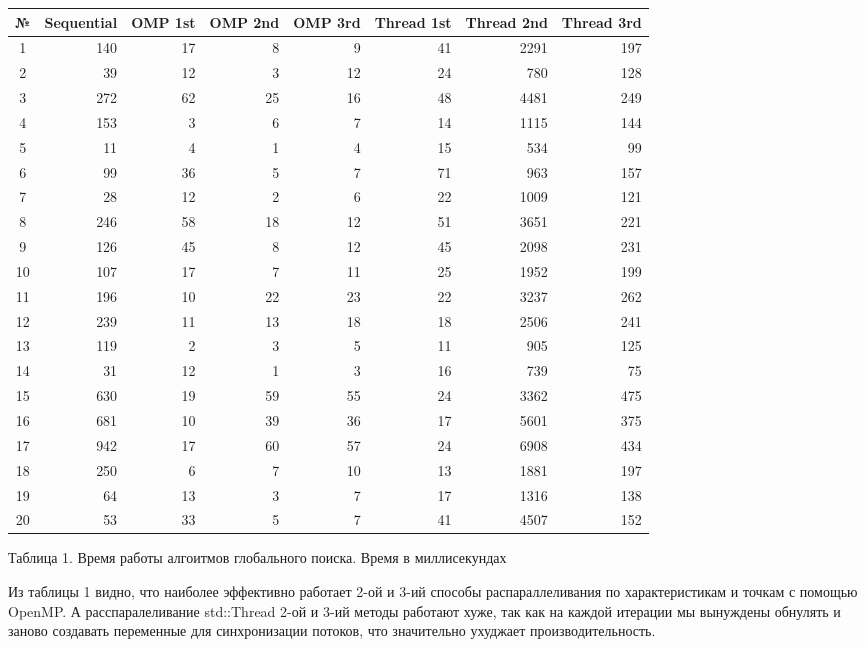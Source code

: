 \documentclass{report}
\begin{document}
\begin{table}[!h]
\centering
\begin{tabular}{ | c | r | r | r | r | r | r | r |}
\hline
№  & Sequential & OMP 1st  & OMP 2nd & OMP 3rd & Thread 1st & Thread 2nd & Thread 3rd \\ \hline
1  & 140 & 17 &  8 &  9 & 41 & 2291 & 197\\ \hline
2  &  39 & 12 &  3 & 12 & 24 &  780 & 128\\ \hline
3  & 272 & 62 & 25 & 16 & 48 & 4481 & 249\\ \hline
4  & 153 &  3 &  6 &  7 & 14 & 1115 & 144\\ \hline
5  &  11 &  4 &  1 &  4 & 15 &  534 &  99\\ \hline
6  &  99 & 36 &  5 &  7 & 71 &  963 & 157\\ \hline
7  &  28 & 12 &  2 &  6 & 22 & 1009 & 121\\ \hline
8  & 246 & 58 & 18 & 12 & 51 & 3651 & 221\\ \hline
9  & 126 & 45 &  8 & 12 & 45 & 2098 & 231\\ \hline
10 & 107 & 17 &  7 & 11 & 25 & 1952 & 199\\ \hline
11 & 196 & 10 & 22 & 23 & 22 & 3237 & 262\\ \hline
12 & 239 & 11 & 13 & 18 & 18 & 2506 & 241\\ \hline
13 & 119 &  2 &  3 &  5 & 11 &  905 & 125\\ \hline
14 &  31 & 12 &  1 &  3 & 16 &  739 &  75\\ \hline
15 & 630 & 19 & 59 & 55 & 24 & 3362 & 475\\ \hline
16 & 681 & 10 & 39 & 36 & 17 & 5601 & 375\\ \hline
17 & 942 & 17 & 60 & 57 & 24 & 6908 & 434\\ \hline
18 & 250 &  6 &  7 & 10 & 13 & 1881 & 197\\ \hline
19 &  64 & 13 &  3 &  7 & 17 & 1316 & 138\\ \hline
20 &  53 & 33 &  5 &  7 & 41 & 4507 & 152\\ \hline
\end{tabular}
\begin{center}
    Таблица 1. Время работы алгоитмов глобального поиска. Время в миллисекундах
\end{center}
\end{table}

Из таблицы 1 видно, что наиболее эффективно работает 2-ой и 3-ий способы распараллеливания по характеристикам и точкам с помощью OpenMP. А расспаралеливание std::Thread 2-ой и 3-ий методы работают хуже, так как на каждой итерации мы вынуждены обнулять и заново создавать переменные для синхронизации потоков, что значительно ухуджает производительность.
\end{document}
